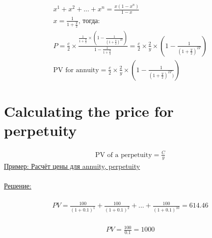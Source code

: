 \documentclass{article}
\begin{document}
\begin{align*}
    & x^{1} + x^{2} + ... + x^{n} = \frac{x(1-x^{n})}{1-x}\\
    & x=\frac{1}{1+\frac{y}{2}} \text{, тогда:}\\
    & P = \frac{c}{2} \times \frac{\frac{1}{1 + \frac{y}{2}} \times (1 - \frac{1}{(1 + \frac{y}{2})^{2T}})}{1 - \frac{1}{1 + \frac{y}{2}}} = \frac{c}{2} \times \frac{2}{y} \times (1 - \frac{1}{(1 + \frac{y}{2})^{2T}})\\
    & \text{PV for annuity} = \frac{c}{2} \times \frac{2}{y} \times (1 - \frac{1}{(1 + \frac{y}{2})^{2T})})
\end{align*}
 \section{Calculating the price for perpetuity}
 \begin{align*}
    & \text{PV of a perpetuity} = \frac{C}{y}
\end{align*}
\underline{Пример: Расчёт цены для annuity, perpetuity}\\
\\
\underline{Решение:}\\
\\
 \begin{align*}
    & PV = \frac{100}{(1 + 0.1)^1} + \frac{100}{(1 + 0.1)^2} + ... + \frac{100}{(1 + 0.1)^{10}} = 614.46
\end{align*}
\\
 \begin{align*}
    & PV = \frac{100}{0.1} = 1000
\end{align*}
\end{document}

